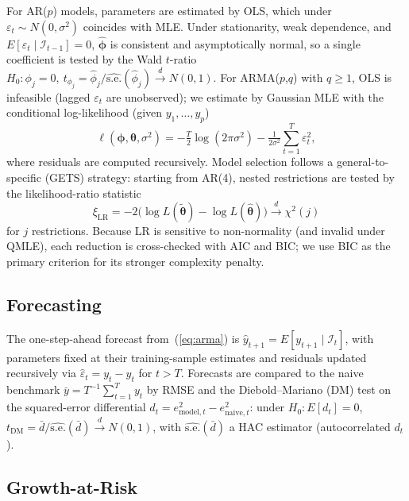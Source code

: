 \documentclass[12pt]{article}
\begin{document}
For AR($p$) models, parameters are estimated by OLS, which under $\varepsilon_t\sim N(0,\sigma^2)$ coincides with MLE. Under stationarity, weak dependence, and $E[\varepsilon_t\mid\mathcal{I}_{t-1}]=0$, $\hat{\boldsymbol{\phi}}$ is consistent and asymptotically normal, so a single coefficient is tested by the Wald $t$-ratio $H_0\colon \phi_j=0,\ t_{\phi_j} = \hat\phi_j/\widehat{\mathrm{s.e.}}(\hat\phi_j)\xrightarrow{d} N(0,1)$.
\newline
For ARMA($p$,$q$) with $q\geq 1$, OLS is infeasible (lagged $\varepsilon_t$ are unobserved); we estimate by Gaussian MLE with the conditional log-likelihood (given $y_1,\ldots,y_p$)
$$
\ell(\boldsymbol{\phi},\boldsymbol{\theta},\sigma^2)= -\tfrac{T}{2}\log(2\pi\sigma^2)-\tfrac{1}{2\sigma^2}\sum_{t=1}^{T}\varepsilon_t^2,
$$
where residuals are computed recursively.
\newline
Model selection follows a general-to-specific (GETS) strategy: starting from AR(4), nested restrictions are tested by the likelihood-ratio statistic
$$
\xi_{\mathrm{LR}}=-2\bigl(\log L(\tilde{\boldsymbol{\theta}})-\log L(\hat{\boldsymbol{\theta}})\bigr)\xrightarrow{d}\chi^2(j)
$$
for $j$ restrictions. Because LR is sensitive to non-normality (and invalid under QMLE), each reduction is cross-checked with AIC and BIC; we use BIC as the primary criterion for its stronger complexity penalty.


\subsection{Forecasting}

The one-step-ahead forecast from~(\ref{eq:arma}) is $\hat{y}_{t+1}=E[y_{t+1}\mid\mathcal{I}_t]$, with parameters fixed at their training-sample estimates and residuals updated recursively via $\hat{\varepsilon}_t = y_t - \hat{y}_t$ for $t>T$. Forecasts are compared to the naive benchmark $\bar{y} = T^{-1}\sum_{t=1}^{T} y_t$ by RMSE and the Diebold--Mariano (DM) test on the squared-error differential $d_t = e_{\mathrm{model},t}^2 - e_{\mathrm{naive},t}^2$: under $H_0\colon E[d_t]=0$, $t_{\mathrm{DM}} = \bar{d}/\widehat{\mathrm{s.e.}}(\bar{d}) \xrightarrow{d} N(0,1)$, with $\widehat{\mathrm{s.e.}}(\bar{d})$ a HAC estimator (autocorrelated $d_t$).

\subsection{Growth-at-Risk}
\end{document}
